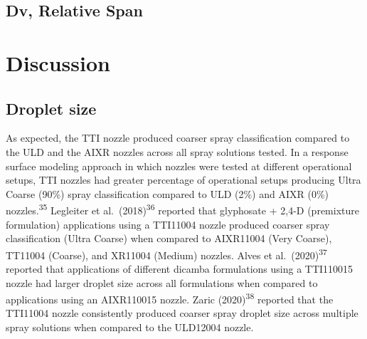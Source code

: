 \documentclass[
  12pt,
  a4paper,
]{article}
\begin{document}
\hypertarget{dv-relative-span}{%
\subsection{Dv, Relative Span}\label{dv-relative-span}}

\hypertarget{discussion}{%
\section{Discussion}\label{discussion}}

\hypertarget{droplet-size}{%
\subsection{Droplet size}\label{droplet-size}}

As expected, the TTI nozzle produced coarser spray classification
compared to the ULD and the AIXR nozzles across all spray solutions
tested. In a response surface modeling approach in which nozzles were
tested at different operational setups, TTI nozzles had greater
percentage of operational setups producing Ultra Coarse (90\%) spray
classification compared to ULD (2\%) and AIXR (0\%)
nozzles.\textsuperscript{35} Legleiter et al.~(2018)\textsuperscript{36}
reported that glyphosate + 2,4-D (premixture formulation) applications
using a TTI11004 nozzle produced coarser spray classification (Ultra
Coarse) when compared to AIXR11004 (Very Coarse), TT11004 (Coarse), and
XR11004 (Medium) nozzles. Alves et al.~(2020)\textsuperscript{37}
reported that applications of different dicamba formulations using a
TTI110015 nozzle had larger droplet size across all formulations when
compared to applications using an AIXR110015 nozzle. Zaric
(2020)\textsuperscript{38} reported that the TTI11004 nozzle
consistently produced coarser spray droplet size across multiple spray
solutions when compared to the ULD12004 nozzle.
\end{document}
